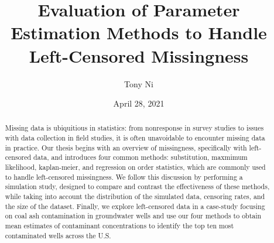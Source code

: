 \documentclass[12pt, twoside]{amherstthesis}
\title{Evaluation of Parameter Estimation Methods to Handle Left-Censored Missingness}
\author{Tony Ni}
\date{April 28, 2021}
\begin{document}
\doublespace
  \maketitle

\frontmatter %
\pagestyle{fancyplain}

  \begin{abstract}
    Missing data is ubiquitious in statistics: from nonresponse in survey studies to issues with data collection in field studies, it is often unavoidable to encounter missing data in practice. Our thesis begins with an overview of missingness, specifically with
    left-censored data, and introduces four common methods: substitution, maxmimum likelihood, kaplan-meier, and regression on order statistics, which are commonly used to handle left-censored missingness. We follow this discussion by performing a simulation study, designed to compare and contrast the effectiveness of these methods, while taking into account the distribution of the simulated data, censoring rates, and the size of the dataset. Finally, we explore left-censored data in a case-study focusing on coal ash contamination in groundwater wells and use our four methods to obtain mean estimates of contaminant concentrations to identify the top ten most contaminated wells across the U.S.
  \end{abstract}
\end{document}

